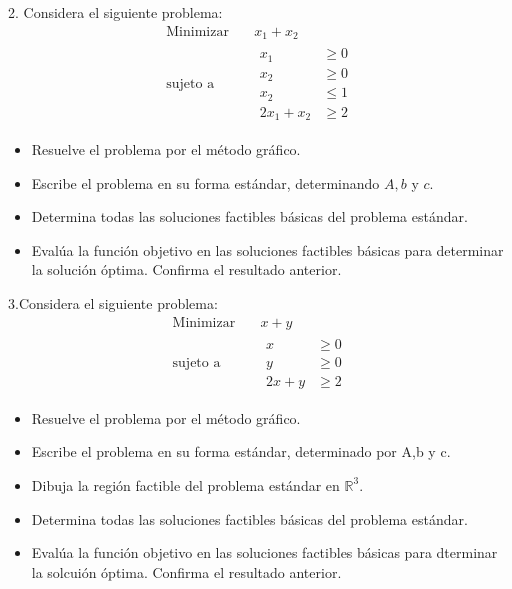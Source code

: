 \documentclass{article}
\begin{document}
2. Considera el siguiente problema:
\begin{equation*}
  \begin{aligned}
    \text{Minimizar}\quad  &   x_1+x_2 \\
    \text{sujeto a}\quad   &
    \begin{aligned}
      x_1     & \geq 0 \\
      x_2     & \geq 0 \\
      x_2     & \leq 1 \\
      2x_1+x_2  & \geq 2
    \end{aligned}
  \end{aligned}
\end{equation*}
\begin{itemize}
\item Resuelve el problema por el método gráfico.
\item Escribe el problema en su forma estándar, determinando $A, b$ y $c$.
\item Determina todas las soluciones factibles básicas del problema estándar.
\item Evalúa la función objetivo en las soluciones factibles básicas para determinar la solución óptima. Confirma el resultado anterior. 
\end{itemize}


3.Considera el siguiente problema:
\begin{equation*}
  \begin{aligned}
    \text{Minimizar}\quad & x+y \\
    \text{sujeto a}\quad &
    \begin{aligned}
      x & \geq 0 \\
      y & \geq 0 \\
      2x+y & \geq 2
    \end{aligned}
  \end{aligned}
\end{equation*}

\begin{itemize}
\item Resuelve el problema por el método gráfico.
\item Escribe el problema en su forma estándar, determinado por A,b y c.
\item Dibuja la región factible del problema estándar en $\mathbb{R}^3$.
\item Determina todas  las soluciones factibles básicas del problema estándar.
\item Evalúa la función objetivo en las soluciones factibles básicas para dterminar la solcuión óptima. Confirma el resultado anterior.
\end{itemize}
\end{document}
